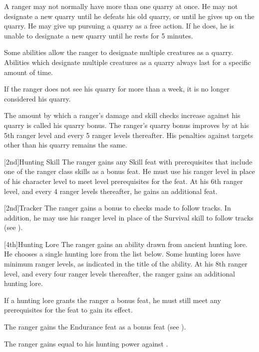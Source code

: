        A ranger may not normally have more than one quarry at once.
        He may not designate a new quarry until he defeats his old quarry, or until he gives up on the quarry.
        He may give up pursuing a quarry as a free action.
        If he does, he is unable to designate a new quarry until he rests for 5 minutes.

        Some abilities allow the ranger to designate multiple creatures as a quarry.
        Abilities which designate multiple creatures as a quarry always last for a specific amount of time.

        If the ranger does not see his quarry for more than a week, it is no longer considered his quarry.

        \par The amount by which a ranger's damage and skill checks increase against his quarry is called his quarry bonus.
        The ranger's quarry bonus improves by  at his 5th ranger level and every 5 ranger levels thereafter.
        His penalties against targets other than his quarry remains the same.

        [2nd]{Hunting Skill}
        The ranger gains any Skill feat with prerequisites that include one of the ranger class skills as a bonus feat.
        He must use his ranger level in place of his character level to meet level prerequisites for the feat.
        At his 6th ranger level, and every 4 ranger levels thereafter, he gains an additional feat.

        [2nd]{Tracker}
        The ranger gains a  bonus to checks made to follow tracks.
        In addition, he may use his ranger level in place of the Survival skill to follow tracks (see ).

        [4th]{Hunting Lore}
        The ranger gains an ability drawn from ancient hunting lore.
        He chooses a single hunting lore from the list below.
        Some hunting lores have minimum ranger levels, as indicated in the title of the ability.
        At his 8th ranger level, and every four ranger levels thereafter, the ranger gains an additional hunting lore.

        If a hunting lore grants the ranger a bonus feat, he must still meet any prerequisites for the feat to gain its effect.

        The ranger gains the Endurance feat as a bonus feat (see ).

        The ranger gains  equal to his hunting power against .

